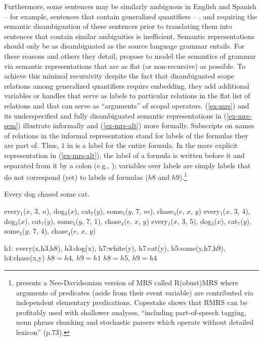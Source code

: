 \documentclass[output=paper]{langsci/langscibook}
\begin{document}
Furthermore, some sentences may be similarly ambiguous in English and Spanish -- for example, sentences that contain generalized quantifiers -- , and requiring the semantic disambiguation of these sentences prior to translating them into sentences that contain similar ambiguities is inefficient. Semantic representations should only be as disambiguated as the source language grammar entails. For these reasons and others they detail, \citet{Copestakeetal1995} propose to model the semantics of grammar via semantic representations that are as flat (or non-recursive) as possible. To achieve this minimal recursivity despite the fact that disambiguated scope relations among generalized quantifiers require embedding, they add additional variables or handles that serve as labels to particular relations in the flat list of relations and that can serve as ``arguments'' of scopal operators. (\ref{ex-mrs}) and its underspecified and fully disambiguated semantic representations in (\ref{ex-mrs-sem}) illustrate informally and (\ref{ex-mrs-alt}) more formally. Subscripts on names of relations in the informal representation stand for labels of the formulas they are part of. Thus, $1$ in  is a label for the entire formula. In the more explicit representation in (\ref{ex-mrs-alt}), the label of a formula is written before it and separated from it by a colon (e.g., ); variables over labels are simply labels that do not correspond (yet) to labels of formulas ($h8$ and $h9$).\footnote{\citet{Copestake2007} presents a Neo-Davidsonian version of MRS called R(obust)MRS where arguments of predicates (aside from their event variable) are contributed via independent elementary predications. Copestake shows that RMRS can be profitably used with shallower analyses, ``including part-of-speech tagging, noun phrase chunking and stochastic parsers which operate without detailed lexicon'' (p.73).}

\begin{exe}
\ex\label{ex-mrs}
Every dog chased some cat.
\ex\label{ex-mrs-sem}
\begin{xlist}
\ex\label{ex-mrs-sem-a}
every$_{1}$($x$, 3, $n$), dog$_{3}$($x$), cat$_{7}$($y$), some$_{5}$($y$, 7, $m$), chase$_{4}$($e$, $x$, $y$)
\ex\label{ex-mrs-sem-b}
every$_{1}$($x$, 3, 4), dog$_{3}$($x$), cat$_{7}$($y$), some$_{5}$($y$, 7, 1), chase$_{4}$($e$, $x$, $y$)
\ex\label{ex-mrs-sem-c}
every$_{1}$($x$, 3, 5), dog$_{3}$($x$), cat$_{7}$($y$), some$_{5}$($y$, 7, 4), chase$_{4}$($e$, $x$, $y$)
\end{xlist}
\ex\label{ex-mrs-alt}
\begin{xlist}
\ex\label{ex-mrs-alt-a}
h1: every(x,h3,h8), h3:dog(x), h7:white(y), h7:cat(y), h5:some(y,h7,h9), h4:chase(x,y)
\ex\label{ex-mrs-alt-b}
$h8 = h4$, $h9 =h1$
\ex\label{ex-mrs-alt-c}
$h8 = h5$, $h9 =h4$
\end{xlist}
\end{exe} 
\end{document}
